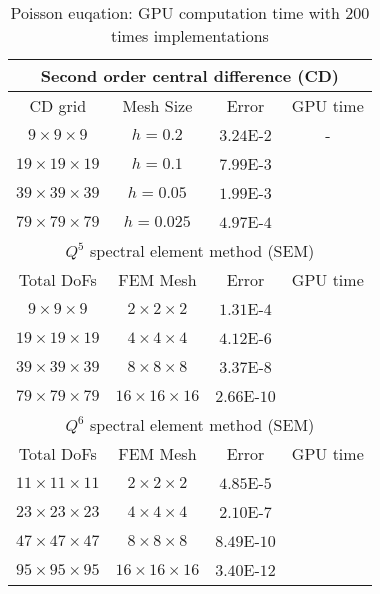 
\begin{table}[!ht]
    \centering
    \begin{tabular}{|c|c|c|c|}
    \hline
    \multicolumn{4}{|c|}{Second order central difference (CD)}\\
    \hline
    CD grid& Mesh Size & Error & GPU time \\
    \hline
    $9\times 9\times 9$ & $h=0.2$ &$3.24$E-$2$ & -\\
    \hline
    $19\times 19\times 19$ & $h=0.1$ &$7.99$E-$3$ &\\
    \hline
    $39\times 39\times 39$ & $h=0.05$ &$1.99$E-$3$ &\\
    \hline
    $79\times 79\times 79$ & $h=0.025$ &$4.97$E-$4$ &\\
    \hline
    \multicolumn{4}{|c|}{$Q^5$ spectral element method (SEM)}\\
    \hline
    Total DoFs & FEM Mesh & Error & GPU time \\
    \hline
    $9\times 9\times 9$ & $2\times 2 \times 2$ & $1.31$E-$4$ & \\
    \hline
    $19\times 19\times 19$ & $4\times 4 \times 4$ & $4.12$E-$6$ & \\
    \hline
    $39\times 39\times 39$ & $8\times 8 \times 8$ & $3.37$E-$8$ & \\
    \hline
    $79\times 79\times 79$ & $16\times 16 \times 16$ & $2.66$E-$10$ & \\
    \hline
    \multicolumn{4}{|c|}{$Q^6$ spectral element method (SEM)}\\
    \hline
    Total DoFs & FEM Mesh & Error & GPU time \\
    \hline
    $11\times 11\times 11$ & $2\times 2 \times 2$ & $4.85$E-$5$ & \\
    \hline
    $23\times 23\times 23$ & $4\times 4 \times 4$ & $2.10$E-$7$ & \\
    \hline
    $47\times 47\times 47$ & $8\times 8 \times 8$ & $8.49$E-$10$ & \\
    \hline
    $95\times 95\times 95$ & $16\times 16 \times 16$ & $3.40$E-$12$ & \\
    \hline
    \end{tabular}
    \caption{Poisson euqation: GPU computation time with $200$ times implementations}
    \label{tab2:Poisson}
\end{table}

